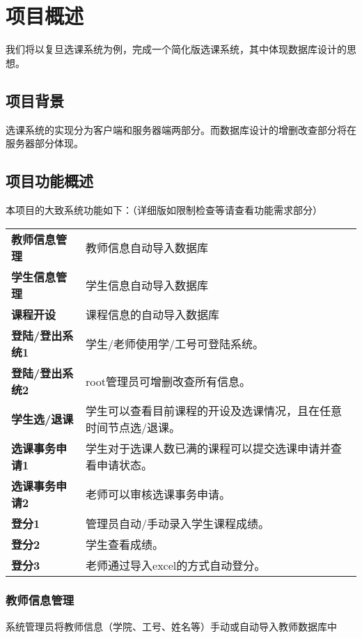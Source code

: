 
\section{项目概述}

我们将以复旦选课系统为例，完成一个简化版选课系统，其中体现数据库设计的思想。

\subsection{项目背景}
选课系统的实现分为客户端和服务器端两部分。而数据库设计的增删改查部分将在服务器部分体现。

\subsection{项目功能概述}

本项目的大致系统功能如下：（详细版如限制检查等请查看功能需求部分）

\begin{table}[h]
\begin{tabular}{ll}
{\bf 教师信息管理}   & 教师信息自动导入数据库 \\
{\bf 学生信息管理} & 学生信息自动导入数据库 \\
{\bf 课程开设}   & 课程信息的自动导入数据库 \\
{\bf 登陆/登出系统1}   & 学生/老师使用学/工号可登陆系统。 \\
{\bf 登陆/登出系统2}   & root管理员可增删改查所有信息。 \\
{\bf 学生选/退课}   & 学生可以查看目前课程的开设及选课情况，且在任意时间节点选/退课。 \\
{\bf 选课事务申请1}   & 学生对于选课人数已满的课程可以提交选课申请并查看申请状态。 \\
{\bf 选课事务申请2}   & 老师可以审核选课事务申请。 \\
{\bf 登分1}   & 管理员自动/手动录入学生课程成绩。 \\  
{\bf 登分2}   & 学生查看成绩。 \\ 
{\bf 登分3}   & 老师通过导入excel的方式自动登分。 \\ 
\end{tabular}
\end{table}



\subsubsection{教师信息管理}
系统管理员将教师信息（学院、工号、姓名等）手动或自动导入教师数据库中

